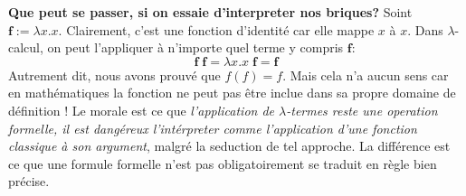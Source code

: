 \textbf{Que peut se passer, si on essaie d'interpreter nos briques?}
Soint $\mathbf{f} := \lambda x.x$.
Clairement, c'est une fonction d'identité car elle mappe $x$ à $x$.
Dans $\lambda$-calcul, on peut l'appliquer à n'importe quel terme y compris $\mathbf{f}$:
$$\mathbf{f} \; \mathbf{f} = \lambda x.x \; \mathbf{f} = \mathbf{f}$$
Autrement dit, nous avons prouvé que $f(f) = f$.
Mais cela n'a aucun sens car en mathématiques la fonction ne peut pas être inclue dans sa propre domaine de définition !
Le morale est ce que \emph{l'application de $\lambda$-termes reste une operation formelle, il est dangéreux l'intérpreter comme l'application d'une fonction classique à son argument}, malgré la seduction de tel approche.
La différence est ce que une formule formelle n'est pas obligatoirement se traduit en règle bien précise.


